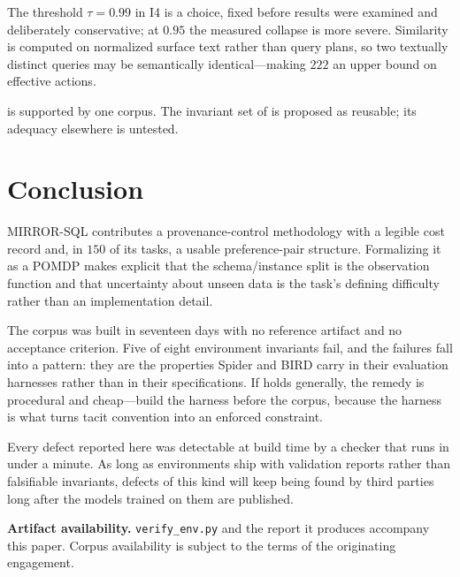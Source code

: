\documentclass[11pt,letterpaper]{article}
\theoremstyle{definition}
\theoremstyle{plain}
\theoremstyle{remark}
\newcommand{\code}[1]{\texttt{#1}}
\begin{document}
The threshold $\tau = 0.99$ in I4 is a choice, fixed before results were examined and
deliberately conservative; at $0.95$ the measured collapse is more severe. Similarity is
computed on normalized surface text rather than query plans, so two textually distinct queries
may be semantically identical---making $222$ an upper bound on effective actions.

 is supported by one corpus. The invariant set of  is
proposed as reusable; its adequacy elsewhere is untested.

\section{Conclusion}
\label{sec:conclusion}

MIRROR-SQL contributes a provenance-control methodology with a legible cost record and, in $150$ of
its tasks, a usable preference-pair structure. Formalizing it as a POMDP makes explicit that
the schema/instance split is the observation function and that uncertainty about unseen data
is the task's defining difficulty rather than an implementation detail.

The corpus was built in seventeen days with no reference artifact and no acceptance criterion.
Five of eight environment invariants fail, and the failures fall into a pattern: they are the
properties Spider and BIRD carry in their evaluation harnesses rather than in their
specifications. If  holds generally, the remedy is procedural and cheap---build
the harness before the corpus, because the harness is what turns tacit convention into an
enforced constraint.

Every defect reported here was detectable at build time by a checker that runs in under a
minute. As long as environments ship with validation reports rather than falsifiable
invariants, defects of this kind will keep being found by third parties long after the models
trained on them are published.

\bigskip
\noindent\textbf{Artifact availability.} \code{verify\_env.py} and the report it produces
accompany this paper. Corpus availability is subject to the terms of the originating
engagement.
\end{document}
